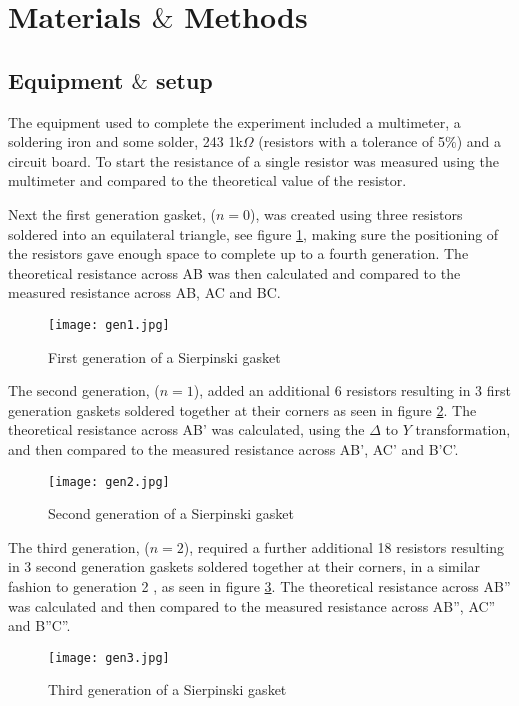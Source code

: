 \documentclass[11pt,a4paper,twocolumn]{paper}
\begin{document}
\section*{Materials $\&$ Methods}


\subsection*{Equipment $\&$ setup}

The equipment used to complete the experiment included a multimeter, a soldering iron and some solder, 243 1k$\Omega$ (resistors with a tolerance of 5$\%$) and a circuit board. To start the resistance of a single resistor was measured using the multimeter and compared to the theoretical value of the resistor.


Next the first generation gasket, ($n=0$), was created using three resistors soldered into an equilateral triangle, see figure \ref{figure 1}, making sure the positioning of the resistors gave enough space to complete up to a fourth generation. The theoretical resistance across AB was then calculated and compared to the measured resistance across AB, AC and BC.


\begin{figure}[htb]
\centering
\texttt{[image: gen1.jpg]}
\caption{First generation of a Sierpinski gasket}
\label{figure 1}
\end{figure}

The second generation, ($n=1$), added an additional 6 resistors resulting in 3 first generation gaskets soldered together at their corners as seen in figure \ref{figure 2}. The theoretical resistance across AB' was calculated, using the $\Delta$ to $Y$ transformation, and then compared to the measured resistance across AB', AC' and B'C'.

\begin{figure}[htb]
\centering
\texttt{[image: gen2.jpg]}
\caption{Second generation of a Sierpinski gasket}
\label{figure 2}
\end{figure}

The third generation, ($n=2$), required a further additional 18 resistors resulting in 3 second generation gaskets soldered together at their corners, in a similar fashion to generation 2 , as seen in figure \ref{figure 3}. The theoretical resistance across AB'' was calculated and then compared to the measured resistance across AB'', AC'' and B''C''.

\begin{figure}[htb]
\centering
\texttt{[image: gen3.jpg]}
\caption{Third generation of a Sierpinski gasket}
\label{figure 3}
\end{figure}
\end{document}
